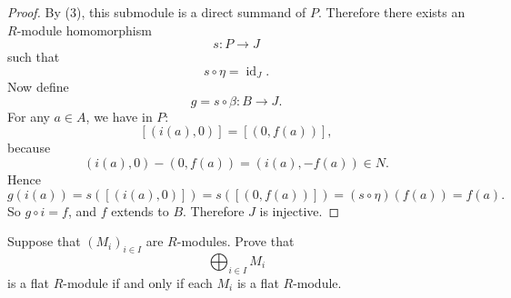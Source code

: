 \begin{proof}
    By \textup{(3)}, this submodule is a direct summand of $P$.
    Therefore there exists an $R$-module homomorphism
    \[
        s\colon P\to J
    \]
    such that
    \[
        s\circ\eta=\operatorname{id}_J.
    \]
    Now define
    \[
        g=s\circ\beta\colon B\to J.
    \]
    For any $a\in A$, we have in $P$:
    \[
        [(i(a),0)]=[(0,f(a))],
    \]
    because
    \[
        (i(a),0)-(0,f(a))=(i(a),-f(a))\in N.
    \]
    Hence
    \[
        g(i(a))
        =s([(i(a),0)])
        =s([(0,f(a))])
        =(s\circ\eta)(f(a))
        =f(a).
    \]
    So $g\circ i=f$, and $f$ extends to $B$.
    Therefore $J$ is injective.
\end{proof}

\begin{exercise}
    Suppose that $(M_i)_{i\in I}$ are $R$-modules. Prove that
    \[
        \bigoplus_{i\in I} M_i
    \]
    is a flat $R$-module if and only if each $M_i$ is a flat $R$-module.
\end{exercise}

